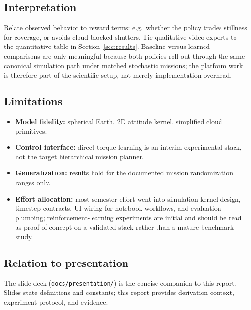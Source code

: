 \label{sec:discussion}

\subsection{Interpretation}
Relate observed behavior to reward terms: e.g.\ whether the policy trades stillness for coverage, or avoids cloud-blocked shutters.
Tie qualitative video exports to the quantitative table in Section~\ref{sec:results}.
Baseline versus learned comparisons are only meaningful because both policies roll out through the same canonical simulation path under matched stochastic missions; the platform work is therefore part of the scientific setup, not merely implementation overhead.

\subsection{Limitations}
\begin{itemize}
  \item \textbf{Model fidelity:} spherical Earth, 2D attitude kernel, simplified cloud primitives.
  \item \textbf{Control interface:} direct torque learning is an interim experimental stack, not the target hierarchical mission planner.
  \item \textbf{Generalization:} results hold for the documented mission randomization ranges only.
  \item \textbf{Effort allocation:} most semester effort went into simulation kernel design, timestep contracts, UI wiring for notebook workflows, and evaluation plumbing; reinforcement-learning experiments are initial and should be read as proof-of-concept on a validated stack rather than a mature benchmark study.
\end{itemize}

\subsection{Relation to presentation}
The slide deck (\texttt{docs/presentation/}) is the concise companion to this report.
Slides state definitions and constants; this report provides derivation context, experiment protocol, and evidence.
